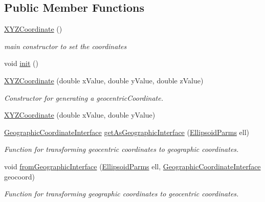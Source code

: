 \subsection*{Public Member Functions}
\begin{DoxyCompactItemize}
\item 
\hyperlink{classcoordinates_1_1_x_y_z_coordinate_a6876892e552ee2a50333c22eef451700}{X\+Y\+Z\+Coordinate} ()
\begin{DoxyCompactList}\small\item\em main constructor to set the coordinates \end{DoxyCompactList}\item 
void \hyperlink{classcoordinates_1_1_x_y_z_coordinate_a88847e65ce05894be77bd2735d15a4ca}{init} ()
\item 
\hyperlink{classcoordinates_1_1_x_y_z_coordinate_ac635db09dd4c2e8415c8d83a199d754c}{X\+Y\+Z\+Coordinate} (double x\+Value, double y\+Value, double z\+Value)
\begin{DoxyCompactList}\small\item\em Constructor for generating a geocentric\+Coordinate. \end{DoxyCompactList}\item 
\hyperlink{classcoordinates_1_1_x_y_z_coordinate_afc0aea9eb642ba760263fe7bedfbf89b}{X\+Y\+Z\+Coordinate} (double x\+Value, double y\+Value)
\item 
\hyperlink{classcoordinates_1_1_geographic_coordinate_interface}{Geographic\+Coordinate\+Interface} \hyperlink{classcoordinates_1_1_x_y_z_coordinate_add6f4e104b8f7c0dfc2f7d63594abe0d}{get\+As\+Geographic\+Interface} (\hyperlink{classparams_1_1_ellipsoid_parms}{Ellipsoid\+Parms} ell)
\begin{DoxyCompactList}\small\item\em Function for transforming geocentric coordinates to geographic coordinates. \end{DoxyCompactList}\item 
void \hyperlink{classcoordinates_1_1_x_y_z_coordinate_a8f62090c5d6f6207d1add9af43354cfb}{from\+Geographic\+Interface} (\hyperlink{classparams_1_1_ellipsoid_parms}{Ellipsoid\+Parms} ell, \hyperlink{classcoordinates_1_1_geographic_coordinate_interface}{Geographic\+Coordinate\+Interface} geocoord)
\begin{DoxyCompactList}\small\item\em Function for transforming geographic coordinates to geocentric coordinates. \end{DoxyCompactList}\item 

\end{DoxyCompactItemize}
